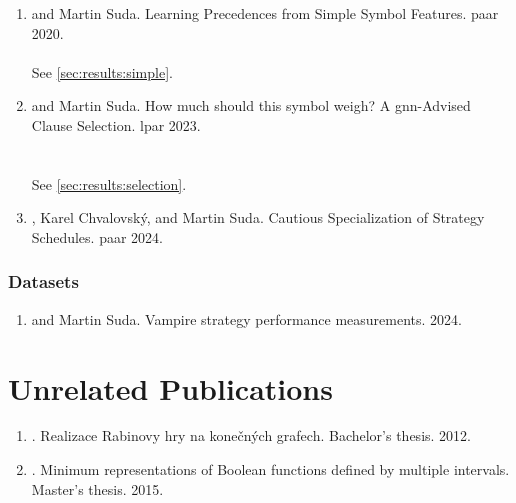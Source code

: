 \begin{enumerate}

\item {} and Martin Suda. Learning Precedences from Simple Symbol Features. \Gls{paar} 2020. \cite{DBLP:conf/cade/Bartek020}
\\ 
\\ See \cref{sec:results:simple}.

\item {} and Martin Suda. How much should this symbol weigh? A \acrshort{gnn}-Advised Clause Selection. \Gls{lpar} 2023. \cite{DBLP:conf/lpar/Bartek023}
\\ 
\\ 
\\ See \cref{sec:results:selection}.

\item {}, Karel Chvalovský, and Martin Suda. Cautious Specialization of Strategy Schedules. \Gls{paar} 2024. \cite{DBLP:conf/paar/BartekC024}

\end{enumerate}


\subsubsection{Datasets}

\begin{enumerate}
\item {} and Martin Suda. Vampire strategy performance measurements. 2024. \cite{bartek10814478}
\end{enumerate}

\section{Unrelated Publications}

\begin{enumerate}
\item {}. \foreignlanguage{czech}{Realizace Rabinovy hry na konečných grafech}. Bachelor's thesis. 2012. \cite{Bartek2012thesis}
\item {}. Minimum representations of Boolean functions defined by multiple intervals. Master's thesis. 2015. \cite{bartek2015}
\end{enumerate}
